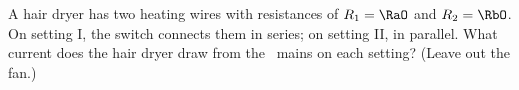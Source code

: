 A hair dryer has two heating wires with resistances of $R_1 = \RaO$ and $R_2 = \RbO$. On setting I, the switch connects them in series; on setting II, in parallel. What current does the hair dryer draw from the \VO\ mains on each setting? (Leave out the fan.)
